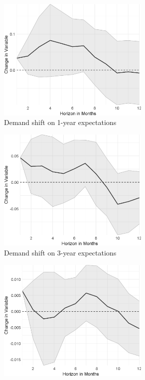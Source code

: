 \begin{figure}
\begin{subfigure}{00.24\textwidth}
		\includegraphics[width=0.8\textwidth]{output/lp/baseline/bHP/demand_shift/demand_shiftonexpectations1y_djn.eps}
		\caption{Demand shift on 1-year expectations}
	\end{subfigure}
	\begin{subfigure}{00.24\textwidth}
		\includegraphics[width=0.8\textwidth]{output/lp/baseline/bHP/demand_shift/demand_shiftonexpectations3y_djn.eps}
		\caption{Demand shift on 3-year expectations}
	\end{subfigure}
	\begin{subfigure}{00.24\textwidth}
		\includegraphics[width=0.8\textwidth]{output/lp/baseline/bHP/demand_shift/demand_shiftoninflation_djn.eps}

\end{subfigure}
\end{figure}
